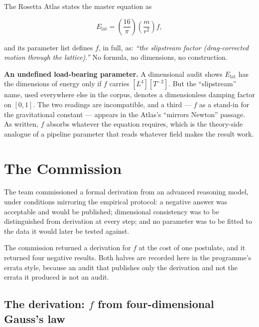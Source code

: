 \documentclass[11pt, letterpaper, openany]{book}
\begin{document}
The Rosetta Atlas states the master equation as

\begin{equation}
E_{\mathrm{lat}} = \left(\frac{16}{\pi}\right)\left(\frac{m}{r^2}\right) f ,
\label{eq:elat}
\end{equation}

and its parameter list defines $f$, in full, as: \emph{``the slipstream factor
(drag-corrected motion through the lattice).''} No formula, no dimensions, no construction.

\begin{formbox}
\textbf{An undefined load-bearing parameter.} A dimensional audit shows $E_{\mathrm{lat}}$ has
the dimensions of energy only if $f$ carries $[L^4][T^{-2}]$. But the ``slipstream'' name, used
everywhere else in the corpus, denotes a dimensionless damping factor on $[0,1]$. The two
readings are incompatible, and a third --- $f$ as a stand-in for the gravitational constant ---
appears in the Atlas's ``mirrors Newton'' passage. As written, $f$ absorbs whatever the equation
requires, which is the theory-side analogue of a pipeline parameter that reads whatever field
makes the result work.
\end{formbox}

\section{The Commission}

The team commissioned a formal derivation from an advanced reasoning model, under conditions
mirroring the empirical protocol: a negative answer was acceptable and would be published;
dimensional consistency was to be distinguished from derivation at every step; and no parameter
was to be fitted to the data it would later be tested against.

The commission returned a derivation for $f$ at the cost of one postulate, and it returned four
negative results. Both halves are recorded here in the programme's errata style, because an
audit that publishes only the derivation and not the errata it produced is not an audit.

\subsection{The derivation: $f$ from four-dimensional Gauss's law}
\end{document}
